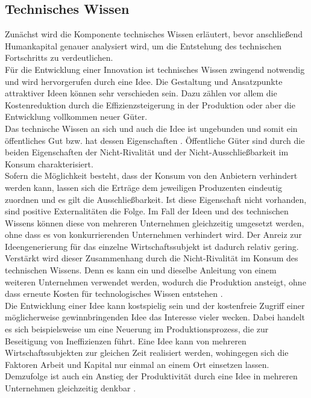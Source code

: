 \subsection{Technisches Wissen}\label{sec:techn. Wissen}
%
Zunächst wird die Komponente technisches Wissen erläutert, bevor anschließend Humankapital genauer analysiert wird, um die Entstehung des technischen Fortschritts zu verdeutlichen.\\
%
Für die Entwicklung einer Innovation ist technisches Wissen zwingend notwendig und wird hervorgerufen durch eine Idee. Die Gestaltung und Ansatzpunkte attraktiver Ideen können sehr verschieden sein. Dazu zählen vor allem die Kostenreduktion durch die Effizienzsteigerung in der Produktion oder aber die Entwicklung vollkommen neuer Güter.\\
%
Das technische Wissen an sich und auch die Idee ist ungebunden und somit ein öffentliches Gut bzw. hat dessen Eigenschaften \cite{Arrow.1962,Nelson.1959}. Öffentliche Güter sind durch die beiden Eigenschaften der Nicht-Rivalität und der Nicht-Ausschließbarkeit im Konsum charakterisiert.\\
%
Sofern die Möglichkeit besteht, dass der Konsum von den Anbietern verhindert werden kann, lassen sich die Erträge dem jeweiligen Produzenten eindeutig zuordnen und es gilt die Ausschließbarkeit. Ist diese Eigenschaft nicht vorhanden, sind positive Externalitäten die Folge. Im Fall der Ideen und des technischen Wissens können diese von mehreren Unternehmen gleichzeitig umgesetzt werden, ohne dass es von konkurrierenden Unternehmen verhindert wird. Der Anreiz zur Ideengenerierung für das einzelne Wirtschaftssubjekt ist dadurch relativ gering. Verstärkt wird dieser Zusammenhang durch die Nicht-Rivalität im Konsum des technischen Wissens. Denn es kann ein und dieselbe Anleitung von einem weiteren Unternehmen verwendet werden, wodurch die Produktion ansteigt, ohne dass erneute Kosten für technologisches Wissen entstehen \cite[S.60]{.1968,Ostrom.1990}.\\
%
Die Entwicklung einer Idee kann kostspielig sein und der kostenfreie Zugriff einer möglicherweise gewinnbringenden Idee das Interesse vieler wecken. Dabei handelt es sich beispielsweise um eine Neuerung im Produktionsprozess, die zur Beseitigung von Ineffizienzen führt. Eine Idee kann von mehreren Wirtschaftssubjekten zur gleichen Zeit realisiert werden, wohingegen sich die Faktoren Arbeit und Kapital nur einmal an einem Ort einsetzen lassen. Demzufolge ist auch ein Anstieg der Produktivität durch eine Idee in mehreren Unternehmen gleichzeitig denkbar \cite[S.1020]{Romer.1986}. \\ 
